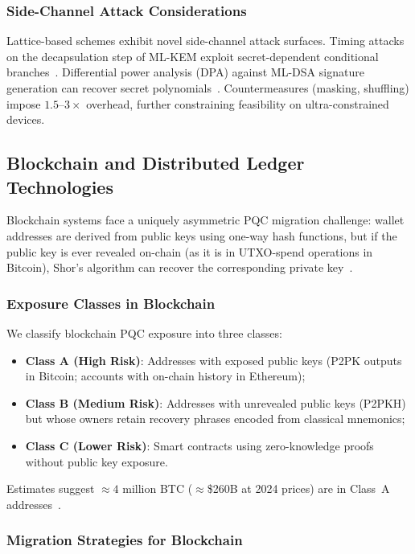\documentclass[journal]{IEEEtran}
\begin{document}
\subsubsection{Side-Channel Attack Considerations}

Lattice-based schemes exhibit novel side-channel attack surfaces. Timing attacks
on the decapsulation step of ML-KEM exploit secret-dependent conditional
branches~\cite{ravi2020masking}. Differential power analysis (DPA) against
ML-DSA signature generation can recover secret polynomials~\cite{ebrahimi2022side}.
Countermeasures (masking, shuffling) impose $1.5$--$3\times$ overhead, further
constraining feasibility on ultra-constrained devices.

\subsection{Blockchain and Distributed Ledger Technologies}
\label{sec:blockchain}

Blockchain systems face a uniquely asymmetric PQC migration challenge: wallet
addresses are derived from public keys using one-way hash functions, but if
the public key is ever revealed on-chain (as it is in UTXO-spend operations in
Bitcoin), Shor's algorithm can recover the corresponding private key~\cite{ding2022ethereum}.

\subsubsection{Exposure Classes in Blockchain}

We classify blockchain PQC exposure into three classes:
\begin{itemize}
  \item \textbf{Class A (High Risk)}: Addresses with exposed public keys
  (P2PK outputs in Bitcoin; accounts with on-chain history in Ethereum);
  \item \textbf{Class B (Medium Risk)}: Addresses with unrevealed public keys
  (P2PKH) but whose owners retain recovery phrases encoded from classical
  mnemonics;
  \item \textbf{Class C (Lower Risk)}: Smart contracts using zero-knowledge
  proofs without public key exposure.
\end{itemize}

Estimates suggest $\approx 4$ million BTC ($\approx$\$260B at 2024 prices)
are in Class~A addresses~\cite{fernandezcarames2020review}.

\subsubsection{Migration Strategies for Blockchain}
\end{document}
